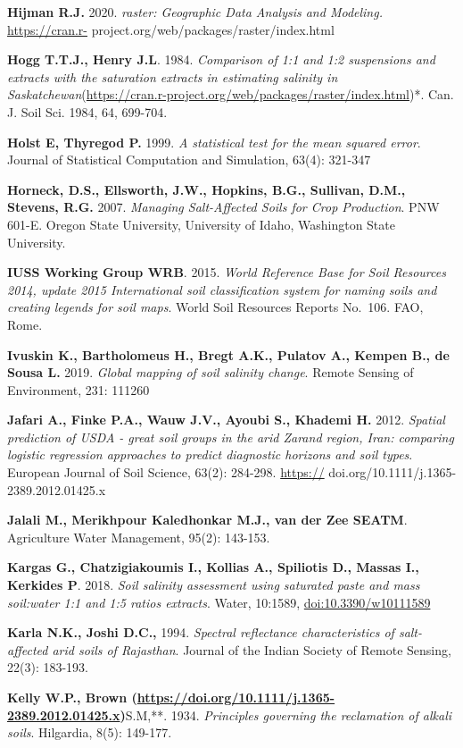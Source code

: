 \documentclass[
  10pt,
  b5paper,
]{book}
\begin{document}
\textbf{Hijman R.J.} 2020. \emph{raster: Geographic Data Analysis and Modeling.} \url{https://cran.r-} project.org/web/packages/raster/index.html

\textbf{Hogg T.T.J., Henry J.L}. 1984. \emph{Comparison of 1:1 and 1:2 suspensions and extracts with the saturation extracts in estimating salinity in Saskatchewan}(\url{https://cran.r-project.org/web/packages/raster/index.html})*. Can. J. Soil Sci. 1984, 64, 699-704.

\textbf{Holst E, Thyregod P.} 1999. \emph{A statistical test for the mean squared error}. Journal of Statistical Computation and Simulation, 63(4): 321-347

\textbf{Horneck, D.S., Ellsworth, J.W., Hopkins, B.G., Sullivan, D.M., Stevens, R.G.} 2007. \emph{Managing Salt-Affected Soils for Crop Production}. PNW 601-E. Oregon State University, University of Idaho, Washington State University.

\textbf{IUSS Working Group WRB}. 2015. \emph{World Reference Base for Soil Resources 2014, update 2015 International soil classification system for naming soils and creating legends for soil maps}. World Soil Resources Reports No.~106. FAO, Rome.

\textbf{Ivuskin K., Bartholomeus H., Bregt A.K., Pulatov A., Kempen B., de Sousa L.} 2019. \emph{Global mapping of soil salinity change}. Remote Sensing of Environment, 231: 111260

\textbf{Jafari A., Finke P.A., Wauw J.V., Ayoubi S., Khademi H.} 2012. \emph{Spatial prediction of USDA - great soil groups in the arid Zarand region, Iran: comparing logistic regression approaches to predict diagnostic horizons and soil types}. European Journal of Soil Science, 63(2): 284-298. \url{https://} doi.org/10.1111/j.1365-2389.2012.01425.x

\textbf{Jalali M., Merikhpour Kaledhonkar M.J., van der Zee SEATM}. Agriculture Water Management, 95(2): 143-153.

\textbf{Kargas G., Chatzigiakoumis I., Kollias A., Spiliotis D., Massas I., Kerkides P}. 2018. \emph{Soil salinity assessment using saturated paste and mass soil:water 1:1 and 1:5 ratios extracts}. Water, 10:1589, \url{doi:10.3390/w10111589}

\textbf{Karla N.K., Joshi D.C.,} 1994. \emph{Spectral reflectance characteristics of salt-affected arid soils of Rajasthan}. Journal of the Indian Society of Remote Sensing, 22(3): 183-193.

\textbf{Kelly W.P., Brown (\url{https://doi.org/10.1111/j.1365-2389.2012.01425.x})}S.M,**. 1934. \emph{Principles governing the reclamation of alkali soils}. Hilgardia, 8(5): 149-177.
\end{document}

